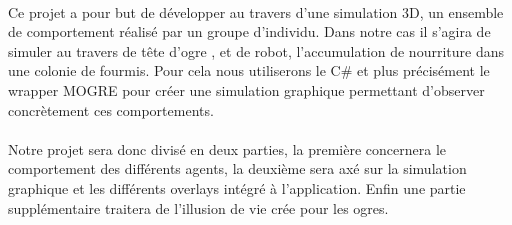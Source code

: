 \paragraph{}
Ce projet a pour but de développer au travers d'une simulation 3D, un
ensemble de comportement réalisé par un groupe d'individu. Dans notre cas il
s'agira de simuler au travers de tête d'ogre , et de robot, l'accumulation de
nourriture dans une colonie de fourmis. Pour cela nous utiliserons le C\# et
plus précisément le wrapper MOGRE pour créer une simulation graphique permettant
d'observer concrètement ces comportements.

\paragraph{}

Notre projet sera donc divisé en deux parties, la première concernera 
le comportement des différents agents, la deuxième sera axé sur la simulation
graphique et les différents overlays intégré à l'application. Enfin une partie
supplémentaire traitera de l'illusion de vie crée pour les ogres.

